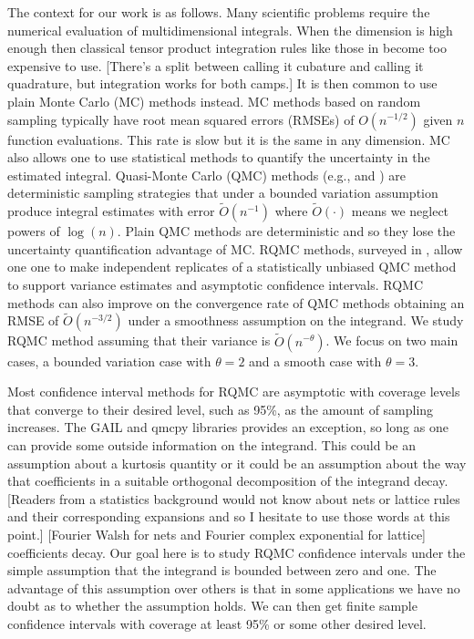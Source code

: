 \documentclass{article}
\newcommand{\art}[1]{\begingroup\color{blue}#1\endgroup}
\newcommand{\fred}[1]{\begingroup\color{red}#1\endgroup}
\begin{document}
The context for our work is as follows.
Many scientific problems require the numerical 
evaluation of multidimensional
integrals. When the dimension is high enough then classical \fred{tensor product \art{integration}} rules 
like those in \cite{DavRab84} become too expensive to use.
\art{[There's a split between calling it cubature and calling
it quadrature, but integration works for both camps.]}
It is then
common to use plain Monte Carlo (MC) methods instead.  MC
methods based on random sampling typically have root mean
squared errors (RMSEs) of $O(n^{-1/2})$ given $n$
function evaluations.  This rate is slow but it is the
same in any dimension.  MC also allows one to use statistical
methods to quantify the uncertainty in the estimated
integral.  Quasi-Monte Carlo (QMC) 
methods (e.g.,  \cite{DicPil10a} and \cite{Nie92}) are deterministic
sampling strategies that under a bounded variation assumption
produce integral estimates with error $\tilde O(n^{-1})$ where
$\tilde O(\cdot)$ means we neglect powers of $\log(n)$.
Plain QMC methods are deterministic and so they lose the
uncertainty quantification advantage of MC. RQMC methods, 
surveyed in \cite{LEcLem02a}, allow one
one to make independent replicates of a statistically
unbiased QMC method to support variance estimates and
asymptotic confidence intervals.  RQMC methods can also
improve on the convergence rate of QMC methods obtaining
an RMSE of $\tilde O(n^{-3/2})$ under a smoothness assumption
\cite{Owe97,Owe08a} on the integrand.  We study RQMC
method assuming that their variance is $\tilde O(n^{-\theta})$.
We focus on two main cases, a bounded variation case with
$\theta=2$ and a smooth case with $\theta=3$.

Most confidence interval methods for RQMC are asymptotic
with coverage levels that converge to their desired level,
such as 95\%, as the amount of sampling increases.  The GAIL \fred{\cite{Gail_ug} and qmcpy \cite{QMCPy2020a} } libraries provides an exception, so long as one can
provide some outside information on the integrand.  This could
be an assumption about a kurtosis quantity or it could be
\art{an assumption about the way that coefficients in
a suitable orthogonal decomposition of the integrand decay.}
\art{[Readers from a statistics background would not
know about nets or lattice rules and their
corresponding expansions and so I hesitate
to use those words at this point.]}
\fred{[Fourier Walsh for nets and Fourier complex exponential for lattice]} coefficients
decay.  Our goal here is to study RQMC confidence intervals
under the simple assumption that the integrand is bounded between
zero and one.  The advantage of this assumption over others is 
that in some applications we have no doubt as to whether the
assumption holds. We can then get finite sample confidence
intervals with coverage at least 95\% or some other desired level.
\end{document}
